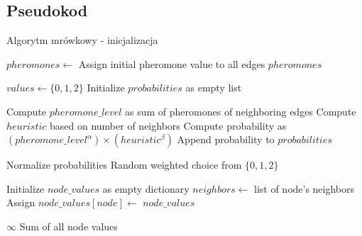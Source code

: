 \subsection{Pseudokod}
\begin{algorithm}
    \caption*{Algorytm mrówkowy - inicjalizacja}
    \begin{algorithmic}[1]
    
            \State $pheromones \gets$ Assign initial pheromone value to all edges
            \State \Return $pheromones$
        \EndFunction
    
            \State $values \gets \{0, 1, 2\}$
            \State Initialize $probabilities$ as empty list
    
                \State Compute $pheromone\_level$ as sum of pheromones of neighboring edges
                \State Compute $heuristic$ based on number of neighbors
                \State Compute probability as $(pheromone\_level^\alpha) \times (heuristic^\beta)$
                \State Append probability to $probabilities$
            \EndFor
    
            \State Normalize probabilities
            \State \Return Random weighted choice from $\{0, 1, 2\}$
        \EndFunction
    
            \State Initialize $node\_values$ as empty dictionary
                \State $neighbors \gets$ list of node's neighbors
                \State Assign $node\_values[node] \gets$ 
            \EndFor
            \State \Return $node\_values$
        \EndFunction
    
                \State \Return $\infty$
            \EndIf
            \State \Return Sum of all node values
        \EndFunction
    
    \end{algorithmic}
\end{algorithm}

